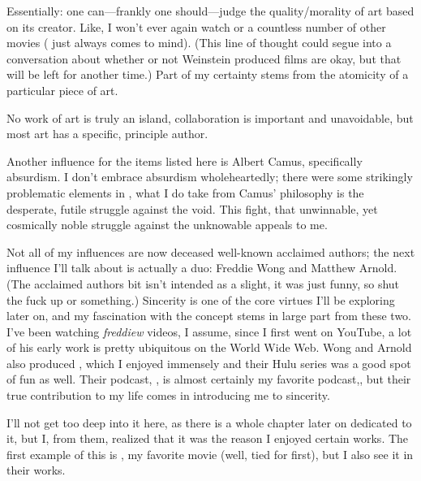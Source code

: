 \documentclass[./butidigress.tex]{subfiles}
\begin{document}
Essentially: one can---frankly one should---judge the quality/morality of art based on its creator.
Like, I won't ever again watch  or a countless number of other movies ( just always comes to mind).
(This line of thought could segue into a conversation about whether or not Weinstein produced films are okay, but that will be left for another time.)
Part of my certainty stems from the atomicity of a particular piece of art.

No work of art is truly an island, collaboration is important and unavoidable, but most art has a specific, principle author.

Another influence for the items listed here is Albert Camus, specifically absurdism.
I don't embrace absurdism wholeheartedly; there were some strikingly problematic elements in , what I do take from Camus' philosophy is the desperate, futile struggle against the void.
This fight, that unwinnable, yet cosmically noble struggle against the unknowable appeals to me.

Not all of my influences are now deceased well-known acclaimed authors; the next influence I'll talk about is actually a duo: Freddie Wong and Matthew Arnold.
(The acclaimed authors bit isn't intended as a slight, it was just funny, so shut the fuck up or something.)
Sincerity is one of the core virtues I'll be exploring later on, and my fascination with the concept stems in large part from these two.
I've been watching \textit{freddiew} videos, I assume, since I first went on YouTube, a lot of his early work is pretty ubiquitous on the World Wide Web.
Wong and Arnold also produced , which I enjoyed immensely and their Hulu series was a good spot of fun as well.
Their podcast, , is almost certainly my favorite podcast,, but their true contribution to my life comes in introducing me to sincerity.

I'll not get too deep into it here, as there is a whole chapter later on dedicated to it, but I, from them, realized that it was the reason I enjoyed certain works.
The first example of this is , my favorite movie (well, tied for first), but I also see it in their works.
\end{document}
